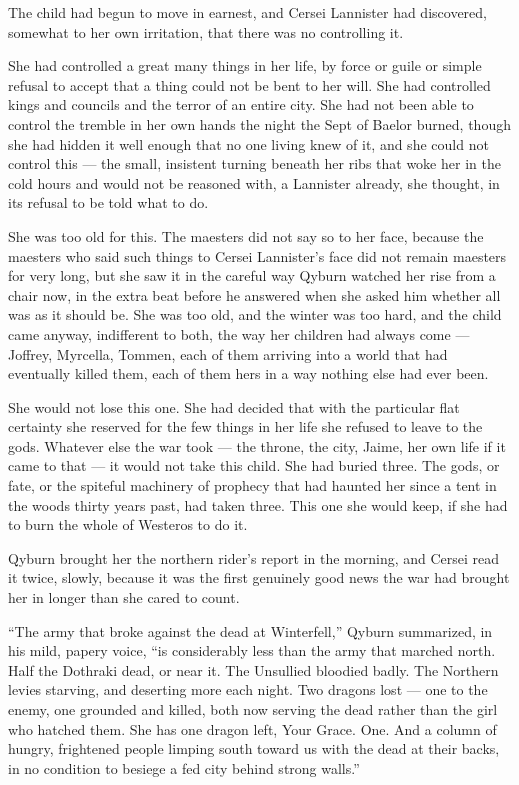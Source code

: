 The child had begun to move in earnest, and Cersei Lannister had discovered, somewhat to her own irritation, that there was no controlling it.

She had controlled a great many things in her life, by force or guile or simple refusal to accept that a thing could not be bent to her will. She had controlled kings and councils and the terror of an entire city. She had not been able to control the tremble in her own hands the night the Sept of Baelor burned, though she had hidden it well enough that no one living knew of it, and she could not control this — the small, insistent turning beneath her ribs that woke her in the cold hours and would not be reasoned with, a Lannister already, she thought, in its refusal to be told what to do.

She was too old for this. The maesters did not say so to her face, because the maesters who said such things to Cersei Lannister’s face did not remain maesters for very long, but she saw it in the careful way Qyburn watched her rise from a chair now, in the extra beat before he answered when she asked him whether all was as it should be. She was too old, and the winter was too hard, and the child came anyway, indifferent to both, the way her children had always come — Joffrey, Myrcella, Tommen, each of them arriving into a world that had eventually killed them, each of them hers in a way nothing else had ever been.

She would not lose this one. She had decided that with the particular flat certainty she reserved for the few things in her life she refused to leave to the gods. Whatever else the war took — the throne, the city, Jaime, her own life if it came to that — it would not take this child. She had buried three. The gods, or fate, or the spiteful machinery of prophecy that had haunted her since a tent in the woods thirty years past, had taken three. This one she would keep, if she had to burn the whole of Westeros to do it.

\sceneBreak

Qyburn brought her the northern rider’s report in the morning, and Cersei read it twice, slowly, because it was the first genuinely good news the war had brought her in longer than she cared to count.

“The army that broke against the dead at Winterfell,” Qyburn summarized, in his mild, papery voice, “is considerably less than the army that marched north. Half the Dothraki dead, or near it. The Unsullied bloodied badly. The Northern levies starving, and deserting more each night. Two dragons lost — one to the enemy, one grounded and killed, both now serving the dead rather than the girl who hatched them. She has one dragon left, Your Grace. One. And a column of hungry, frightened people limping south toward us with the dead at their backs, in no condition to besiege a fed city behind strong walls.”

